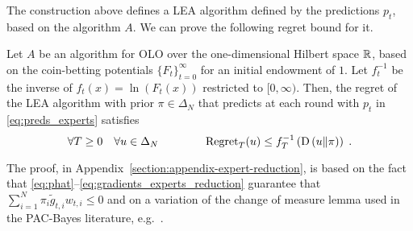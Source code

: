 The construction above defines a \ac{LEA} algorithm defined by the predictions
$p_t$, based on the algorithm $A$.  We can prove the following regret bound for
it.
%
\begin{theorem}
\label{theorem:regret-bound-experts}
Let $A$ be an algorithm for \ac{OLO} over the one-dimensional Hilbert space
$\mathbb{R}$, based on the coin-betting potentials $\{F_t\}_{t=0}^\infty$ for an
initial endowment of $1$. Let $f_t^{-1}$ be the inverse of $f_t(x) =
\ln(F_t(x))$ restricted to $[0,\infty)$.  Then, the regret of the \ac{LEA}
algorithm with prior $\pi \in \Delta_N$ that predicts at each round with $p_t$
in \eqref{eq:preds_experts} satisfies
\[
\forall T \ge 0 \quad \forall u \in \Delta_N \qquad \qquad
\operatorname{Regret}_T(u) \le f_T^{-1}\left( \operatorname{D}\left({u}\middle\|{\pi}\right) \right) \; .
\]
\end{theorem}
The proof, in Appendix~\ref{section:appendix-expert-reduction}, is based on the
fact that \eqref{eq:phat}--\eqref{eq:gradients_experts_reduction} guarantee
that $\sum_{i=1}^N \pi_i \widetilde g_{t,i} w_{t,i} \le 0$ and on a variation
of the change of measure lemma used in the PAC-Bayes literature,
e.g.~\cite{McAllester-2013}.
